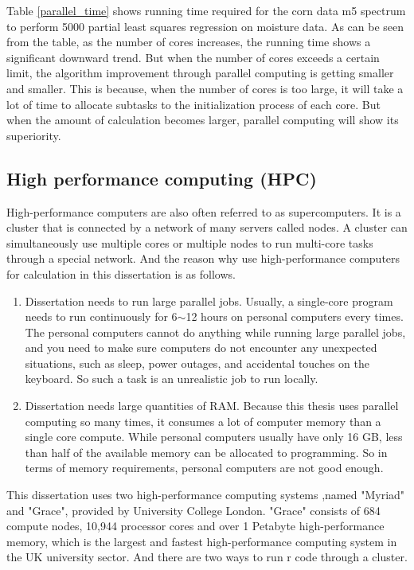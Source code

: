 \documentclass[a4paper,12pt,titlepage]{article} %
\numberwithin{equation}{section}  %
\begin{document}
	
	Table \ref{parallel_time} shows running time required for the corn data m5 spectrum to perform 5000 partial least squares regression on moisture data. As can be seen from the table, as the number of cores increases, the running time shows a significant downward trend. But when the number of cores exceeds a certain limit, the algorithm improvement through parallel computing is getting smaller and smaller. This is because, when the number of cores is too large, it will take a lot of time to allocate subtasks to the initialization process of each core. But when the amount of calculation becomes larger, parallel computing will show its superiority.
	

	

	
	\subsection{High performance computing (HPC)}
	\label{myriad}
	
	High-performance computers are also often referred to as supercomputers. It is a cluster that is connected by a network of many servers called nodes. A cluster can simultaneously use multiple cores or multiple nodes to run multi-core tasks through a special network. And the reason why use high-performance computers for calculation in this dissertation is as follows.

	\begin{enumerate}
	\item Dissertation needs to run large parallel jobs. Usually, a single-core program needs to run continuously for 6$\sim$12 hours on personal computers every times. The personal computers cannot do anything  while running large parallel jobs, and you need to make sure computers do not encounter any unexpected situations, such as sleep, power outages, and accidental touches on the keyboard. So such a task is an unrealistic job to run locally.

	\item Dissertation needs large quantities of RAM. Because this thesis uses parallel computing so many times, it consumes a lot of computer memory than a single core compute. While personal computers usually have only 16 GB, less than half of the available memory can be allocated to programming. So in terms of memory requirements, personal computers are not good enough.

	\end{enumerate}

	This dissertation uses two high-performance computing systems ,named "Myriad" and "Grace", provided by University College London. "Grace" consists of 684 compute nodes, 10,944 processor cores and over 1 Petabyte high-performance memory, which is the largest and fastest high-performance computing system in the UK university sector.  And there are two ways to run r code through a cluster.
\end{document}
